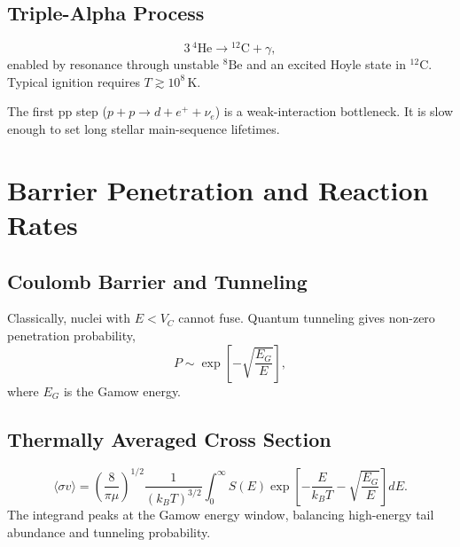 \subsection{Triple-Alpha Process}
\begin{theory}
\begin{equation}
    3\,{}^4\text{He}\rightarrow{}^{12}\text{C}+\gamma,
\end{equation}
enabled by resonance through unstable ${}^8\text{Be}$ and an excited Hoyle state in ${}^{12}\text{C}$.
Typical ignition requires $T\gtrsim10^8\,$K.
\end{theory}

\begin{importantnote}
The first pp step ($p+p\to d+e^++\nu_e$) is a weak-interaction bottleneck.
It is slow enough to set long stellar main-sequence lifetimes.
\end{importantnote}

\section{Barrier Penetration and Reaction Rates}

\subsection{Coulomb Barrier and Tunneling}
\begin{foundation}
Classically, nuclei with $E<V_C$ cannot fuse.
Quantum tunneling gives non-zero penetration probability,
\begin{equation}
    P\sim \exp\left[-\sqrt{\frac{E_G}{E}}\right],
\end{equation}
where $E_G$ is the Gamow energy.
\end{foundation}

\subsection{Thermally Averaged Cross Section}
\begin{theory}
\begin{equation}
    \langle\sigma v\rangle = \left(\frac{8}{\pi\mu}\right)^{1/2}
    \frac{1}{(k_BT)^{3/2}}\int_0^\infty S(E)
    \exp\left[-\frac{E}{k_BT}-\sqrt{\frac{E_G}{E}}\right]dE.
\end{equation}
The integrand peaks at the Gamow energy window, balancing high-energy tail abundance and tunneling probability.
\end{theory}

